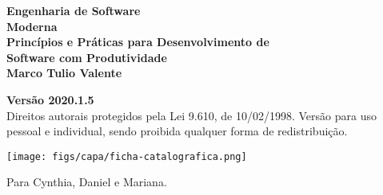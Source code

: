 \thispagestyle{empty}



\newpage
\thispagestyle{empty}
\vspace*{4cm}
\begin{center}
{\Huge \bf  Engenharia de Software\\[.3cm] Moderna}\\ 
\vspace*{1cm}
{\Large \bf  Princípios e Práticas para Desenvolvimento de\\[.3cm] Software com Produtividade}\\ 
\vspace*{3cm}
{\Large \bf Marco Tulio Valente}
\end{center}
\newpage

\newpage
\thispagestyle{empty}
\vspace*{3cm}
\begin{center}
{\Large \bf  Versão 2020.1.5}\\ 
\vspace*{1cm}
{\large Direitos autorais protegidos pela Lei 9.610, de 10/02/1998. Versão para  uso pessoal e individual, sendo proibida qualquer forma de redistribuição.}
\end{center}

\vspace*{3cm}
\begin{center}
\texttt{[image: figs/capa/ficha-catalografica.png]}
\end{center}

\newpage

\newpage
\thispagestyle{empty}
\vspace*{5cm}
\begin{center}
\large Para Cynthia, Daniel e Mariana.
\end{center}

\newpage
\newpage

\tableofcontents
